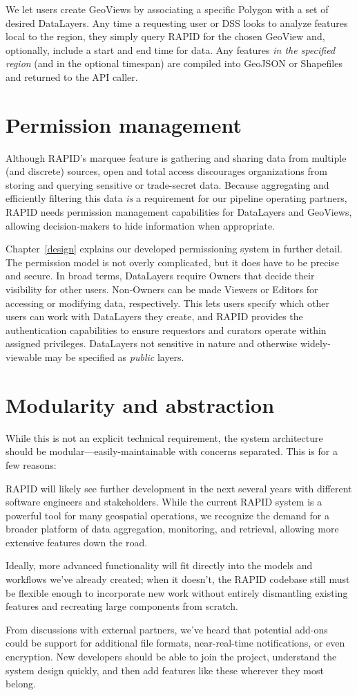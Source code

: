 We let users create GeoViews by associating a specific Polygon with a set of desired DataLayers. Any time a requesting user or DSS looks to analyze features local to the region, they simply query RAPID for the chosen GeoView and, optionally, include a start and end time for data. Any features \textit{in the specified region} (and in the optional timespan) are compiled into GeoJSON or Shapefiles and returned to the API caller.

\section{Permission management}
Although RAPID's marquee feature is gathering and sharing data from multiple (and discrete) sources, open and total access discourages organizations from storing and querying sensitive or trade-secret data. Because aggregating and efficiently filtering this data \textit{is} a requirement for our pipeline operating partners, RAPID needs permission management capabilities for DataLayers and GeoViews, allowing decision-makers to hide information when appropriate.

Chapter~\ref{design} explains our developed permissioning system in further detail. The permission model is not overly complicated, but it does have to be precise and secure. In broad terms, DataLayers require Owners that decide their visibility for other users. Non-Owners can be made Viewers or Editors for accessing or modifying data, respectively. This lets users specify which other users can work with DataLayers they create, and RAPID provides the authentication capabilities to ensure requestors and curators operate within assigned privileges. DataLayers not sensitive in nature and otherwise widely-viewable may be specified as \textit{public} layers.

\section{Modularity and abstraction}
While this is not an explicit technical requirement, the system architecture should be modular---easily-maintainable with concerns separated. This is for a few reasons:

RAPID will likely see further development in the next several years with different software engineers and stakeholders. While the current RAPID system is a powerful tool for many geospatial operations, we recognize the demand for a broader platform of data aggregation, monitoring, and retrieval, allowing more extensive features down the road.

Ideally, more advanced functionality will fit directly into the models and workflows we've already created; when it doesn't, the RAPID codebase still must be flexible enough to incorporate new work without entirely dismantling existing features and recreating large components from scratch.

From discussions with external partners, we've heard that potential add-ons could be support for additional file formats, near-real-time notifications, or even encryption. New developers should be able to join the project, understand the system design quickly, and then add features like these wherever they most belong.